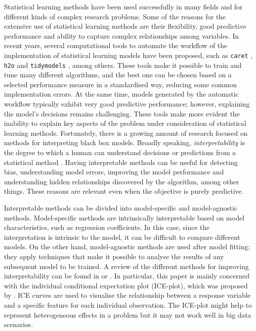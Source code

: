 \documentclass[smallextended,natbib]{svjour3}\usepackage[]{graphicx}\usepackage[]{xcolor}
\newcommand{\1}[1]{\mathbbm{1}_{#1}}
\begin{document}
Statistical learning methods have been used successfully in many fields and for different kinds of complex research problems. Some of the reasons for the extensive use of statistical learning methods are their flexibility, good predictive performance and ability to capture complex relationships among variables. In recent years, several computational tools to automate the workflow of the implementation of statistical learning models have been proposed, such as \texttt{caret} \citep{caret}, \texttt{h2o} \citep{h2o} and \texttt{tidymodels} \citep{tidymodels}, among others. These tools make it possible to train and tune many different algorithms, and the best one can be chosen based on a selected performance measure in a standardised way, reducing some common implementation errors. At the same time, models generated by the automatic workflow typically exhibit very good predictive performance; however, explaining the model’s decisions remains challenging.
These tools make more evident the inability to explain key aspects of the problem under consideration of statistical learning methods. Fortunately, there is a growing amount of research focused on methods for interpreting black box models. Broadly speaking, \textit{interpretability} is the degree to which a human can understand decisions or predictions from a statistical method \citep{miller2019explanation}. Having interpretable methods can be useful for detecting bias, understanding model errors, improving the model performance and understanding hidden relationships discovered by the algorithm, among other things. These reasons are relevant even when the objective is purely predictive. 

Interpretable methods can be divided into model-specific and model-agnostic methods. Model-specific methods are intrinsically interpretable based on model characteristics, such as regression coefficients. In this case, since the interpretation is intrinsic to the model, it can be difficult to compare different models. On the other hand, model-agnostic methods are used after model fitting; they apply techniques that make it possible to analyse the results of any subsequent model to be trained. A review of the different methods for improving interpretability can be found in \cite{molnar2020} or \cite{maksymiuk2020landscape}.  
In particular, this paper is mainly concerned with the individual conditional expectation plot (ICE-plot), which was proposed by \cite{goldstein2015peeking}. ICE curves are used to visualise the relationship between a response variable and a specific feature for each individual observation. The ICE-plot might help to represent heterogeneous effects in a problem but it may not work well in big data scenarios.  
\end{document}
